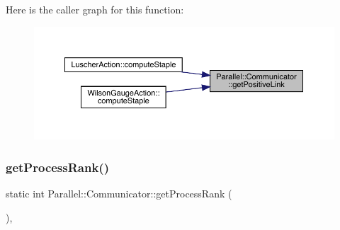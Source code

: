 Here is the caller graph for this function\+:
\nopagebreak
\begin{figure}[H]
\begin{center}
\leavevmode
\includegraphics[width=350pt]{class_parallel_1_1_communicator_aa716fcde544018dcc5967df9b6708bb5_icgraph}
\end{center}
\end{figure}
\mbox{\label{class_parallel_1_1_communicator_a474ab433da0e83ef372d74e26a7e5cb0}} 
\subsubsection{\texorpdfstring{getProcessRank()}{getProcessRank()}}
{\footnotesize\ttfamily static int Parallel\+::\+Communicator\+::get\+Process\+Rank (\begin{DoxyParamCaption}{ }\end{DoxyParamCaption})\hspace{0.3cm}{\ttfamily [inline]}, {\ttfamily [static]}}

